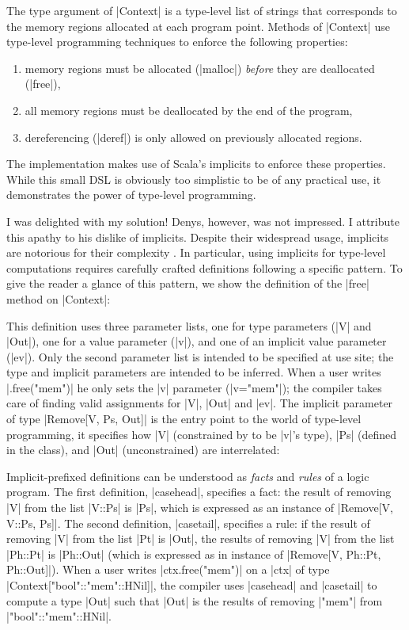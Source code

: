 \memImplicitMain

\noindent
The type argument of |Context| is a type-level list of strings that corresponds to the memory regions allocated at each program point.
Methods of |Context| use type-level programming techniques to enforce the following properties:

\begin{enumerate}
  \item memory regions must be allocated (|malloc|) \emph{before} they are deallocated (|free|),
  \item all memory regions must be deallocated by the end of the program,
  \item dereferencing (|deref|) is only allowed on previously allocated regions.
\end{enumerate}

\noindent
The implementation makes use of Scala's implicits to enforce these properties.
While this small DSL is obviously too simplistic to be of any practical use, it demonstrates the power of type-level programming.

I was delighted with my solution!
Denys, however, was not impressed.
I attribute this apathy to his dislike of implicits.
Despite their widespread usage, implicits are notorious for their complexity \citep{filip2019implicits}.
In particular, using implicits for type-level computations requires carefully crafted definitions following a specific pattern.
To give the reader a glance of this pattern, we show the definition of the |free| method on |Context|:

\memImplicitContext

\noindent
This definition uses three parameter lists, one for type parameters (|V| and |Out|), one for a value parameter (|v|), and one of an implicit value parameter (|ev|).
Only the second parameter list is intended to be specified at use site; the type and implicit parameters are intended to be inferred.
When a user writes |.free("mem")| he only sets the |v| parameter (|v="mem"|); the compiler takes care of finding valid assignments for |V|, |Out| and |ev|.
The implicit parameter of type |Remove[V, Ps, Out]| is the entry point to the world of type-level programming, it specifies how |V| (constrained by to be |v|'s type), |Ps| (defined in the class), and |Out| (unconstrained) are interrelated:

\memImplicitRemove

\noindent
Implicit-prefixed definitions can be understood as \emph{facts} and \emph{rules} of a logic program.
The first definition, |casehead|, specifies a fact: the result of removing |V| from the list |V::Ps| is |Ps|, which is expressed as an instance of |Remove[V, V::Ps, Ps]|.
The second definition, |casetail|, specifies a rule: if the result of removing |V| from the list |Pt| is |Out|, the results of removing |V| from the list |Ph::Pt| is |Ph::Out| (which is expressed as in instance of |Remove[V, Ph::Pt, Ph::Out]|).
When a user writes |ctx.free("mem")| on a |ctx| of type |Context["bool"::"mem"::HNil]|, the compiler uses |casehead| and |casetail| to compute a type |Out| such that |Out| is the results of removing |"mem"| from |"bool"::"mem"::HNil|.


